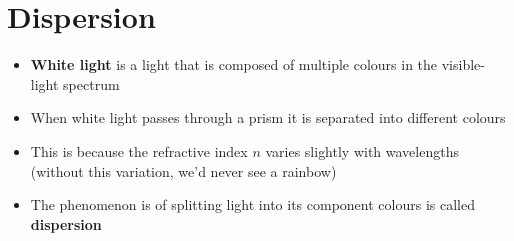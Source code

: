 \section{Dispersion}
%
%
%
%
%
%
% 
%    
\begin{itemize}
\item\textbf{White light} is a light that is composed of multiple colours
  in the visible-light spectrum
\item When white light passes through a prism it is separated into
  different colours
\item This is because the refractive index $n$ varies slightly with
  wavelengths (without this variation, we'd never see a rainbow)
\item The phenomenon is of splitting light into its component colours is
  called \textbf{dispersion}
\end{itemize}
  




%
%
%
%
%
%
%

